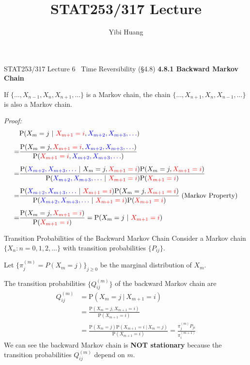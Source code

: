 \documentclass[letterpaper, mathserif]{beamer}
\title{STAT253/317 Lecture \chapnum}
\date{}
\author{Yibi Huang}
\def\p{\mathrm P}
\def\chapnum{6}
\begin{document}
\begin{frame}{STAT253/317 Lecture \chapnum ~ Time Reversibility (\S 4.8)}
\mbox{}
{\bf 4.8.1 Backward Markov Chain}

If $\{\ldots,X_{n-1},X_{n},X_{n+1},\ldots\}$ is a Markov chain,
the  chain $\{\ldots,X_{n+1},X_{n},X_{n-1},\ldots\}$ is also a Markov chain.\smallskip

{\em Proof:}
\begin{align*}
&{}\p(X_m = j~|~{\color{red}X_{m+1} = i},{\color{blue}X_{m+2},X_{m+3}, \ldots})\\[5pt]
=&{}\frac{\p(X_m = j, {\color{red}X_{m+1} = i},{\color{blue}X_{m+2},X_{m+3}, \ldots})}{\p({\color{red}X_{m+1} = i},{\color{blue}X_{m+2},X_{m+3}, \ldots})}\\[5pt]
=&{}\frac{\p({\color{blue}X_{m+2},X_{m+3}, \ldots}~|~X_m = j, {\color{red}X_{m+1} = i})\p(X_m = j, {\color{red}X_{m+1} = i})}{\p({\color{blue}X_{m+2},X_{m+3}, \ldots}~|~{\color{red}X_{m+1} = i})\p({\color{red}X_{m+1} = i})}\\[5pt]
=&{}\frac{\p({\color{blue}X_{m+2},X_{m+3}, \ldots}~|~{\color{red}X_{m+1} = i})\p(X_m = j, {\color{red}X_{m+1} = i})}{\p({\color{blue}X_{m+2},X_{m+3}, \ldots}~|~{\color{red}X_{m+1} = i})\p({\color{red}X_{m+1} = i})}\; (\mbox{Markov Property})\\[5pt]
=&{}\frac{\p(X_m = j, {\color{red}X_{m+1} = i})}{\p({\color{red}X_{m+1} = i})}=\p(X_m = j~|~{\color{red}X_{m+1} = i})
\end{align*}
\end{frame}
\begin{frame}{Transition Probabilities of the Backward Markov Chain}
Consider a Markov chain $\{X_n: n=0,1,2,\ldots\}$ with transition probabilities $\{P_{ij}\}$.

Let $\{\pi^{(m)}_j = P(X_m=j)\}_{j \geq 0}$ be the marginal distribution of $X_m$.

The transition probabilities $\{Q^{(m)}_{ij}\}$ of the backward Markov chain are
\begin{align*}
Q^{(m)}_{ij} &= \p(X_{m}=j~|~X_{m+1}=i)\\
&=\frac{\p(X_{m}=j, X_{m+1}=i)}{\p(X_{m+1}=i)}\\
&=\frac{\p(X_{m}=j)\p(X_{m+1}=i~|~X_{m}=j)}{\p(X_{m+1}=i)}=\frac{\pi^{(m)}_j P_{ji}}{\pi^{(m+1)}_i}
\end{align*}
We can see the backward Markov chain is {\bf NOT stationary} because the transition probabilities $Q^{(m)}_{ij}$ depend on $m$.

\end{frame}
\end{document}
